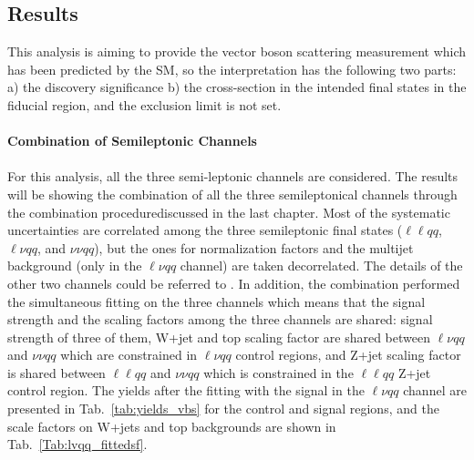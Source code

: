 \subsection{Results}
This analysis is aiming to provide the vector boson scattering measurement which has been predicted by the SM, so the interpretation has the following two parts: a) the discovery significance b) the cross-section in the intended final states in the fiducial region, and the exclusion limit is not set. 
\\
\\{\bf Combination of Semileptonic Channels}
\\
\\For this analysis, all the three semi-leptonic channels are considered. The results will be showing the combination of all the three semileptonical channels through the combination procedurediscussed in the last chapter. Most of the systematic uncertainties are correlated among the three semileptonic final states ($\ell\ell qq$, $\ell\nu qq$, and $\nu\nu qq$), but the ones for normalization factors and the multijet background (only in the $\ell\nu qq$ channel) are taken decorrelated. The details of the other two channels could be referred to \cite{Aad:2019xxo}. In addition, the combination performed the simultaneous fitting on the three channels which means that the signal strength and the scaling factors among the three channels are shared: signal strength of three of them, W+jet and top scaling factor are shared between $\ell\nu qq$ and $\nu\nu qq$ which are constrained in $\ell\nu qq$ control regions, and Z+jet scaling factor is shared between $\ell\ell qq$ and $\nu\nu qq$ which is constrained in the $\ell\ell qq$ Z+jet control region. The yields after the fitting with the signal in the $\ell\nu qq$ channel are presented in Tab.~\ref{tab:yields_vbs} for the control and signal regions, and the scale factors on W+jets and top backgrounds are shown in Tab.~\ref{Tab:lvqq_fittedsf}.
